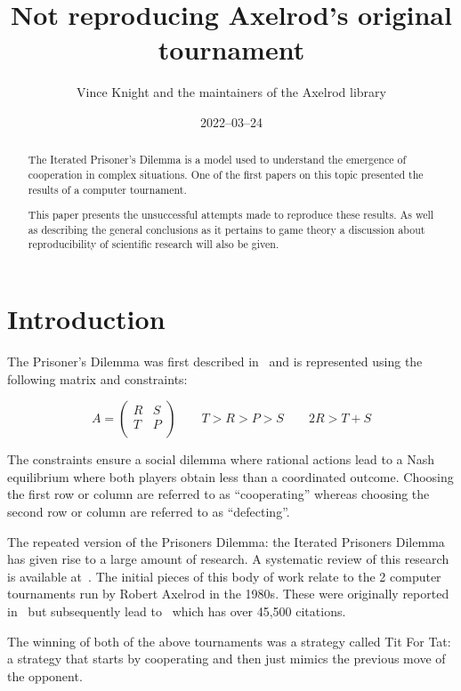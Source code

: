 \documentclass[a4paper]{article}
\title{Not reproducing Axelrod's original tournament}
\author{Vince Knight and the maintainers of the Axelrod library}
\date{2022--03--24}
\begin{document}
\maketitle

\begin{abstract}
The Iterated Prisoner's Dilemma is a model used to understand the emergence of
cooperation in complex situations. One of the first papers on this topic
presented the results of a computer tournament.

This paper presents the unsuccessful attempts made to reproduce these results.
As well as describing the general conclusions as it pertains to game theory a
discussion about reproducibility of scientific research will also be given.
\end{abstract}

\section{Introduction}

The Prisoner's Dilemma was first described in~\cite{flood1958some} and is
represented using the following matrix and constraints:

\begin{equation}
    A = \begin{pmatrix}
            R & S\\
            T & P\\
        \end{pmatrix}
        \qquad
    T > R > P > S
        \qquad
    2R > T + S
\end{equation}

The constraints ensure a social dilemma where rational actions lead to a Nash
equilibrium where both players obtain less than a coordinated outcome.
Choosing the first row or column are referred to as ``cooperating'' whereas
choosing the second row or column are referred to as ``defecting''.

The repeated version of the Prisoners Dilemma: the Iterated Prisoners Dilemma
has given rise to a large amount of research. A systematic review of this
research is available at~\cite{glynatsi2021bibliometric}. The initial pieces of
this body of work relate to the 2 computer tournaments run by Robert Axelrod in
the 1980s. These were originally reported in~\cite{axelrod1980effective,
axelrod1980more} but subsequently lead to~\cite{axelrod1981evolution} which has
over 45,500 citations.

The winning of both of the above tournaments was a strategy called
Tit For Tat: a strategy that starts by cooperating and then just mimics
the previous move of the opponent.
\end{document}
